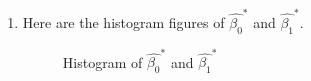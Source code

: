\documentclass[12pt,letterpaper]{article}
\begin{document}
\begin{enumerate}[label=\textbf{(\Alph*)}]
\begin{enumerate}[label=(\roman*)]
\item Here are the histogram figures of $\hat{\beta_0}^{*}$ and $\hat{\beta_1}^{*}$.
\begin{figure}[H]
	\centering
	\caption{ Histogram of $\hat{\beta_0}^{*}$ and $\hat{\beta_1}^{*}$}
\end{figure}



\end{enumerate}
\end{enumerate}
\end{document}
